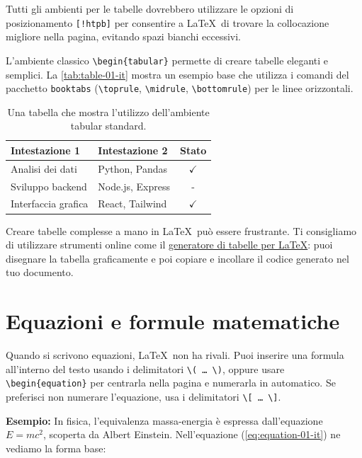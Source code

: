{	\begin{block}[tip]
		Tutti gli ambienti per le tabelle dovrebbero utilizzare le opzioni di posizionamento \texttt{[!htpb]} per consentire a \LaTeX\ di trovare la collocazione migliore nella pagina, evitando spazi bianchi eccessivi.
	\end{block}
	
	L'ambiente classico \texttt{\textbackslash begin\{tabular\}} permette di creare tabelle eleganti e semplici. La \autoref{tab:table-01-it} mostra un esempio base che utilizza i comandi del pacchetto \texttt{booktabs} (\texttt{\textbackslash toprule}, \texttt{\textbackslash midrule}, \texttt{\textbackslash bottomrule}) per le linee orizzontali.
	
	\begin{table}[!htpb]
		\caption{Una tabella che mostra l'utilizzo dell'ambiente tabular standard.}
		\label{tab:table-01-it}
		\centering
		\begin{tabular}{llc}
			\toprule
			\textbf{Intestazione 1} & \textbf{Intestazione 2} & \textbf{Stato} \\ 
			\midrule
			Analisi dei dati      & Python, Pandas    & $\checkmark$  \\
			Sviluppo backend      & Node.js, Express  & -             \\
			Interfaccia grafica   & React, Tailwind   & $\checkmark$  \\
			\bottomrule
		\end{tabular}
	\end{table}
	
	Creare tabelle complesse a mano in \LaTeX\ può essere frustrante. Ti consigliamo di utilizzare strumenti online come il \href{https://www.tablesgenerator.com/}{generatore di tabelle per LaTeX}: puoi disegnare la tabella graficamente e poi copiare e incollare il codice generato nel tuo documento.
	
	\section{Equazioni e formule matematiche}
	Quando si scrivono equazioni, \LaTeX\ non ha rivali. Puoi inserire una formula all'interno del testo usando i delimitatori \texttt{\textbackslash( \ldots\ \textbackslash)}, oppure usare \texttt{\textbackslash begin\{equation\}} per centrarla nella pagina e numerarla in automatico. Se preferisci non numerare l'equazione, usa i delimitatori \texttt{\textbackslash[ \ldots\ \textbackslash]}.
	
	\vspace{.875em}
	\textbf{Esempio:} In fisica, l'equivalenza massa-energia è espressa dall'equazione \(E=mc^2\), scoperta da Albert Einstein. Nell'equazione (\ref{eq:equation-01-it}) ne vediamo la forma base:
	
}
